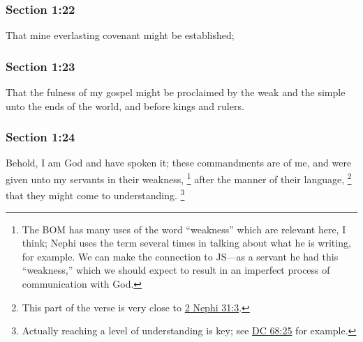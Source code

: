 	\subsubsection{Section 1:22} %
		\label{DC1-22}

		That mine everlasting covenant might be established;


	\subsubsection{Section 1:23} %
		\label{DC1-23}

		That the fulness of my gospel might be proclaimed by the weak and the simple unto the ends of the world, and before kings and rulers.


	\subsubsection{Section 1:24} %
		\label{DC1-24}

		Behold, I am God and have spoken it; these commandments are of me, and were given unto my servants in their weakness,%
			\footnote{%
				The BOM has many uses of the word ``weakness'' which are relevant here, I think; Nephi uses the term several times in talking about what he is writing, for example. We can make the connection to JS---as a servant he had this ``weakness,'' which we should expect to result in an imperfect process of communication with God.
				}
		after the manner of their language,%
			\footnote{%
				This part of the verse is very close to \hyperref[2NEPHI-31-3]{2 Nephi 31:3}.
				}
		that they might come to understanding.%
			\footnote{%
				Actually reaching a level of understanding is key; see \hyperref[DC68-25]{DC 68:25} for example.
				}

